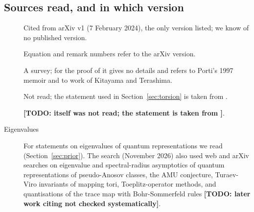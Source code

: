 \documentclass[11pt]{amsart}
\newcommand{\todo}[1]{\textbf{[TODO: #1]}}
\theoremstyle{definition}
\theoremstyle{remark}
\begin{document}
\subsection{Sources read, and in which version}\label{app:reading}
\begin{description}
\item[\cite{PW}] Cited from arXiv v1 (7 February 2024), the only version listed; we
know of no published version.
\item[\cite{HK}] Equation and remark numbers refer to the arXiv version.
\item[\cite{Porti}] A survey; for the proof of \cite[Prop.~5.9]{Porti} it gives no
details and refers to Porti's 1997 memoir and to work of Kitayama and Terashima.
\item[\cite{Yam}] Not read; the statement used in Section~\ref{sec:torsion} is taken
from \cite[(4) and Thm.~1.7]{GY21}.
\item[\cite{Moser}] \todo{\cite{Moser} itself was not read; the statement is taken
from \cite{GG, Gong}}.
\item[Eigenvalues] For statements on eigenvalues of quantum representations we read
\cite{AMU, San, AP, Cha, MP, BCGP, DK, DK2, BDKY} (Section~\ref{sec:prior}). The
search (November 2026) also used web and arXiv searches on eigenvalue and
spectral-radius asymptotics of quantum representations of pseudo-Anosov classes, the
AMU conjecture, Turaev-Viro invariants of mapping tori, Toeplitz-operator methods, and
quantisations of the trace map with Bohr-Sommerfeld rules
\todo{later work citing \cite{AMU, San, BCGP} not checked systematically}.
\end{description}



\end{document}
